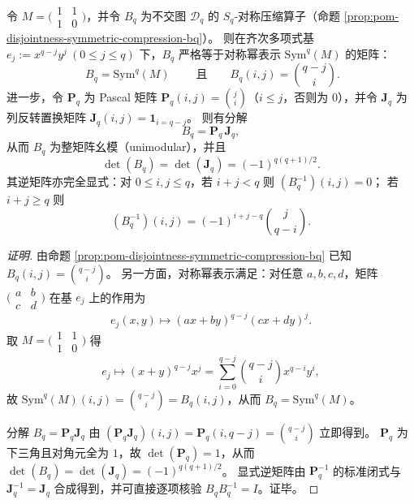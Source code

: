 \begin{conclusion}[\texorpdfstring{$S_q$}{Sq}-对称压缩等于对称幂表示：\texorpdfstring{$B_q=\mathrm{Sym}^q(M)$}{Bq=Sym^q(M)} 且幺模可逆并给出显式逆矩阵]\label{con:xi-terminal-disjointness-bq-sympower-unimodular-inverse}
令 \(M=\bigl(\begin{smallmatrix}1&1\\[2pt]1&0\end{smallmatrix}\bigr)\)，并令 \(B_q\) 为不交图 \(\mathcal D_q\) 的 \(S_q\)-对称压缩算子（命题 \ref{prop:pom-disjointness-symmetric-compression-bq}）。
则在齐次多项式基
\(
e_j:=x^{q-j}y^j\ (0\le j\le q)
\)
下，\(B_q\) 严格等于对称幂表示 \(\mathrm{Sym}^q(M)\) 的矩阵：
\[
\boxed{\;B_q=\mathrm{Sym}^q(M)\;}
\qquad\text{且}\qquad
B_q(i,j)=\binom{q-j}{i}.
\]
进一步，令 \(\mathbf{P}_q\) 为 Pascal 矩阵 \(\mathbf{P}_q(i,j)=\binom{j}{i}\)（\(i\le j\)，否则为 \(0\)），并令 \(\mathbf{J}_q\) 为列反转置换矩阵 \(\mathbf{J}_q(i,j)=\mathbf{1}_{i=q-j}\)。
则有分解
\[
B_q=\mathbf{P}_q\,\mathbf{J}_q,
\]
从而 \(B_q\) 为整矩阵幺模（unimodular），并且
\[
\det(B_q)=\det(\mathbf{J}_q)=(-1)^{q(q+1)/2}.
\]
其逆矩阵亦完全显式：对 \(0\le i,j\le q\)，若 \(i+j<q\) 则 \((B_q^{-1})(i,j)=0\)；
若 \(i+j\ge q\) 则
\[
(B_q^{-1})(i,j)=(-1)^{i+j-q}\binom{j}{q-i}.
\]
\end{conclusion}
\begin{proof}[证明]
由命题 \ref{prop:pom-disjointness-symmetric-compression-bq} 已知 \(B_q(i,j)=\binom{q-j}{i}\)。
另一方面，对称幂表示满足：对任意 \(a,b,c,d\)，矩阵 \(\bigl(\begin{smallmatrix}a&b\\ c&d\end{smallmatrix}\bigr)\) 在基 \(e_j\) 上的作用为
\[
e_j(x,y)\longmapsto (ax+by)^{q-j}(cx+dy)^j.
\]
取 \(M=\bigl(\begin{smallmatrix}1&1\\ 1&0\end{smallmatrix}\bigr)\) 得
\[
e_j\longmapsto (x+y)^{q-j}x^j=\sum_{i=0}^{q-j}\binom{q-j}{i}x^{q-i}y^i,
\]
故 \(\mathrm{Sym}^q(M)(i,j)=\binom{q-j}{i}=B_q(i,j)\)，从而 \(B_q=\mathrm{Sym}^q(M)\)。
\par
分解 \(B_q=\mathbf{P}_q\mathbf{J}_q\) 由
\((\mathbf{P}_q\mathbf{J}_q)(i,j)=\mathbf{P}_q(i,q-j)=\binom{q-j}{i}\)
立即得到。
\(\mathbf{P}_q\) 为下三角且对角元全为 \(1\)，故 \(\det(\mathbf{P}_q)=1\)，从而 \(\det(B_q)=\det(\mathbf{J}_q)=(-1)^{q(q+1)/2}\)。
显式逆矩阵由 \(\mathbf{P}_q^{-1}\) 的标准闭式与 \(\mathbf{J}_q^{-1}=\mathbf{J}_q\) 合成得到，并可直接逐项核验 \(B_qB_q^{-1}=I\)。证毕。
\end{proof}

